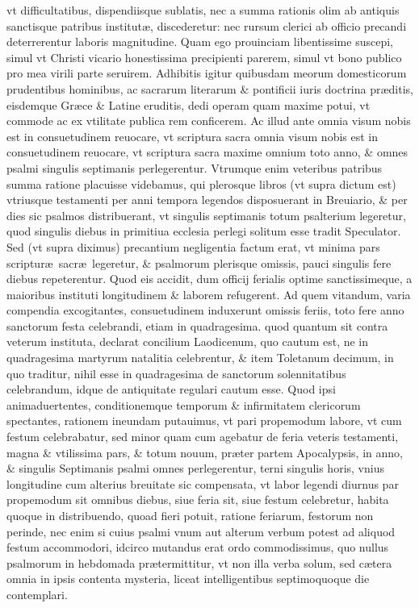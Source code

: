 \documentclass[a5paper,10pt]{book}
\def\ae{æ}
\begin{document}
vt difficultatibus, dispendiisque sublatis, nec a summa rationis olim ab antiquis sanctisque patribus institut\ae, discederetur:
nec rursum clerici ab officio precandi deterrerentur laboris magnitudine.
Quam ego prouinciam libentissime suscepi, simul vt Christi vicario honestissima precipienti parerem, simul vt bono publico pro mea virili parte seruirem.
Adhibitis igitur quibusdam meorum domesticorum prudentibus hominibus, ac sacrarum literarum \& pontificii iuris doctrina pr\ae ditis, eisdemque Gr\ae ce \& Latine eruditis, dedi operam quam %
maxime potui, vt commode ac ex vtilitate publica rem conficerem.
Ac illud ante omnia visum nobis est in consuetudinem reuocare, vt scriptura sacra omnia visum nobis est in consuetudinem reuocare, vt scriptura sacra maxime omnium toto anno, \& omnes %
psalmi singulis septimanis perlegerentur.%
Vtrumque enim veteribus patribus summa ratione placuisse videbamus, qui plerosque libros (vt supra dictum est) vtriusque testamenti per anni tempora legendos disposuerant in Breuiario, \& per dies sic psalmos distribuerant, vt singulis septimanis
totum psalterium legeretur, quod singulis diebus in primitiua ecclesia perlegi solitum esse tradit Speculator.
Sed (vt supra diximus) precantium negligentia factum erat, vt minima pars scriptur\ae \ sacr\ae \ legeretur, \& psalmorum plerisque omissis, pauci singulis fere diebus repeterentur.
Quod eis accidit, dum officij ferialis optime sanctissimeque, a maioribus instituti longitudinem \& laborem refugerent.
Ad quem vitandum, varia compendia excogitantes, consuetudinem induxerunt omissis feriis, toto fere anno sanctorum %
festa celebrandi, etiam in quadragesima.
quod %
quantum sit contra veterum instituta, declarat concilium Laodicenum, quo cautum est, ne in quadragesima martyrum natalitia celebrentur, \& item Toletanum decimum, in quo traditur, nihil esse in quadragesima de sanctorum %
solennitatibus %
celebrandum, idque de antiquitate regulari cautum esse.
Quod ipsi animaduertentes, conditionemque temporum \& infirmitatem clericorum spectantes, rationem ineundam putauimus, vt pari propemodum labore, vt cum festum celebrabatur, sed minor quam %
cum agebatur de feria veteris testamenti, magna \& vtilissima pars, \& totum nouum, pr\ae ter partem Apocalypsis, in anno, \& singulis Septimanis psalmi omnes perlegerentur, terni singulis horis, vnius longitudine cum alterius breuitate sic compensata, vt labor legendi diurnus par propemodum sit omnibus diebus, siue feria sit, siue festum celebretur, habita quoque in distribuendo, quoad fieri potuit, ratione feriarum, festorum non perinde, nec enim si cuius psalmi vnum aut alterum verbum potest ad aliquod festum accommodori, idcirco mutandus erat ordo commodissimus, quo nullus psalmorum in hebdomada pr\ae termittitur, vt non illa verba solum, sed c\ae tera omnia in ipsis contenta mysteria, liceat intelligentibus septimoquoque die contemplari.
\end{document}
